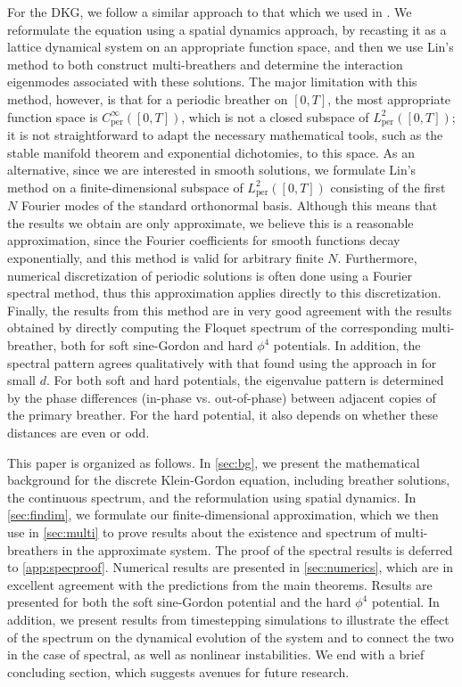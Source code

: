 \documentclass[12pt,reqno]{amsart}
\def\per{\textrm{per}}
\theoremstyle{definition}
\begin{document}
For the DKG, we follow a similar approach to that which we used in \cite{Parker2020}. We reformulate the equation using a spatial dynamics approach, by recasting it as a lattice dynamical system on an appropriate function space, and then we use Lin's method to both construct multi-breathers and determine the interaction eigenmodes associated with these solutions. The major limitation with this method, however, is that for a periodic breather on $[0,T]$, the most appropriate function space is $C^\infty_\per([0,T])$, which is not a closed subspace of $L^2_\per([0,T])$; it is not straightforward to adapt the necessary mathematical tools, such as the stable manifold theorem and exponential dichotomies, to this space. As an alternative, since we are interested in smooth solutions, we formulate Lin's method on a finite-dimensional subspace of $L^2_\per([0,T])$ consisting of the first $N$ Fourier modes of the standard orthonormal basis. Although this means that the results we obtain are only approximate, we believe this is a reasonable approximation, since the Fourier coefficients for smooth functions decay exponentially, and this method is valid for arbitrary finite $N$. Furthermore, numerical discretization of periodic solutions is often done using a Fourier spectral method, thus this approximation applies directly to this discretization. Finally, the results from this method are in very good agreement with the results obtained by directly computing the Floquet spectrum of the corresponding multi-breather, both for soft sine-Gordon and hard $\phi^4$ potentials. In addition, the spectral pattern agrees qualitatively with that found using the approach in \cites{Pelinovsky2012,cuevas-maraver2016} for small $d$. For both soft and hard potentials, the eigenvalue pattern is determined by the phase differences (in-phase vs. out-of-phase) between adjacent copies of the primary breather. For the hard potential, it also depends on whether these distances are even or odd.

This paper is organized as follows. In \cref{sec:bg}, we present the mathematical background for the discrete Klein-Gordon equation, including breather solutions, the continuous spectrum, and the reformulation using spatial dynamics. In \cref{sec:findim}, we formulate our finite-dimensional approximation, which we then use in \cref{sec:multi} to prove results about the existence and spectrum of multi-breathers in the approximate system. The proof of the spectral results is deferred to \cref{app:specproof}. Numerical results are presented in \cref{sec:numerics}, which are in excellent agreement with the predictions from the main theorems. Results are presented for both the soft sine-Gordon potential and the hard $\phi^4$ potential. In addition, we present results from timestepping simulations to illustrate the effect of the spectrum on the dynamical evolution of the system and to connect the two in the case of 
spectral, as well as nonlinear instabilities. We end with a brief concluding section, which suggests avenues for future research.
\end{document}
